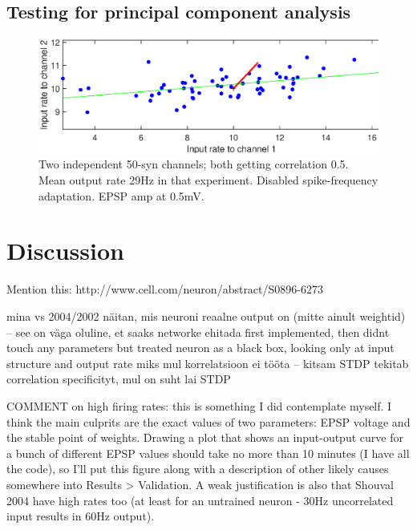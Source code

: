 \documentclass[a4paper,12pt]{report}
\theoremstyle{definition}
\begin{document}
\section{Testing for principal component analysis} %



\begin{figure}[!htb]
    \centering
    \includegraphics[width=\textwidth]{figures/exp10_pca.eps}
    \caption{Two independent 50-syn channels; both getting correlation 0.5. Mean output rate 29Hz in that experiment. Disabled spike-frequency adaptation. EPSP amp at 0.5mV.}
    \label{fig:exp10_pca}
\end{figure}










\chapter{Discussion}
Mention this: http://www.cell.com/neuron/abstract/S0896-6273%

mina vs 2004/2002
näitan, mis neuroni reaalne output on (mitte ainult weightid) -- see on väga oluline, et saaks networke ehitada
first implemented, then didnt touch any parameters but treated neuron as a black box, looking only at input structure and output rate
miks mul korrelatsioon ei tööta -- kitsam STDP tekitab correlation specificityt, mul on suht lai STDP

COMMENT on high firing rates: this is something I did contemplate myself. I think the main culprits are the exact values of two parameters: EPSP voltage and the stable point of weights. Drawing a plot that shows an input-output curve for a bunch of different EPSP values should take no more than 10 minutes (I have all the code), so I'll put this figure along with a description of other likely causes somewhere into Results > Validation. A weak justification is also that Shouval 2004 have high rates too (at least for an untrained neuron - 30Hz uncorrelated input results in 60Hz output).
\end{document}
